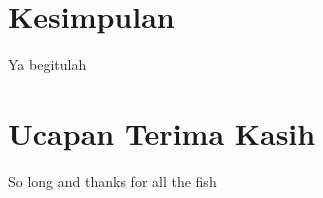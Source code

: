 \documentclass[fleqn,10pt]{SelfArx} %
\begin{document}




\section{Kesimpulan}

Ya begitulah


\section*{Ucapan Terima Kasih} %


So long and thanks for all the fish
\nocite{*}





\end{document}
